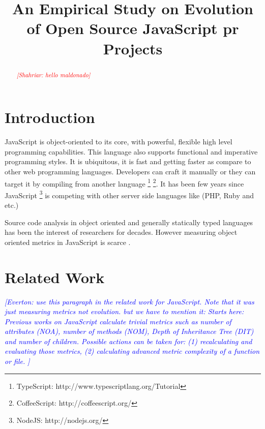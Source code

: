 \documentclass[conference]{IEEEtran}
\newcommand{\shahriar}[1]{\textcolor{red}{{\it [Shahriar: #1]}}}
\newcommand{\everton}[1]{\textcolor{blue}{{\it [Everton: #1]}}}
\begin{document}
	\title{An Empirical Study on Evolution of Open Source JavaScript pr Projects}
	
	\author{
		
		}
	
	\maketitle
	
	\begin{abstract}
		\shahriar{hello maldonado}
		
	\end{abstract}
	
	\IEEEpeerreviewmaketitle
	
	\section{Introduction}
	\label{sec:introduction}
		JavaScript is object-oriented to its core, with powerful, flexible high level programming capabilities. This language also supports functional and imperative programming styles. It is ubiquitous, it is fast and getting faster as compare to other web programming languages. Developers can craft it manually or they can target it by compiling from another language \footnote{TypeScript: http://www.typescriptlang.org/Tutorial} \footnote{CoffeeScript: http://coffeescript.org/}. It has been few years since JavaScript \footnote{NodeJS: http://nodejs.org/} is competing with other server side languages like (PHP, Ruby and etc.)
		
		\par
		Source code analysis in object oriented and generally statically typed languages has been the interest of researchers for decades. However measuring object oriented metrics in JavaScript is scarce \cite{Richards:2010:ADB:1809028.1806598} \cite{6320536}.
		
	\section{Related Work}
	\label{sec:related_work}
	\everton{ use this paragraph in the related work for JavaScript. Note that it was just measuring metrics not evolution. but we have to mention it: 
		Starts here:
		Previous works on JavaScript calculate trivial metrics such as number of attributes (NOA), number of methods (NOM), Depth of Inheritance Tree (DIT) and number of children. Possible actions can be taken for: (1) recalculating and evaluating those metrics, (2) calculating advanced metric complexity of a function or file. }
	
\end{document}

